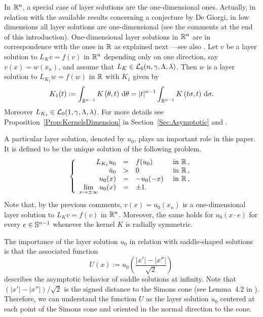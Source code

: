 In $\mathbb{R}^n$, a special case of layer solutions are the one-dimensional ones. Actually, in relation with the available results concerning a conjecture by De Giorgi, in low dimensions all layer solutions are one-dimensional (see the comments at the end of this introduction). One-dimensional layer solutions in $\mathbb{R}^n$ are in correspondence with the ones in $\mathbb{R}$ as explained next ---see also \cite{CozziPassalacqua}. Let $v$ be a layer solution to $L_K v = f(v)$ in $\mathbb{R}^n$ depending only on one direction, say $v(x) = w(x_n)$, and assume that $L_{K}\in \mathcal{L}_0(n,\gamma,\Lambda, \lambda)$. Then $w$ is a layer solution to $L_{K_1} w = f(w)$ in $\mathbb{R}$ with $K_1$ given by
$$
K_1(t) := \int_{\mathbb{R}^{n-1}} K\left(\theta,t\right) \,\mathrm{d} \theta = |t|^{n-1} \int_{\mathbb{R}^{n-1}} K\left(t\sigma,t\right) \,\mathrm{d} \sigma.
$$
Moreover $L_{K_1}\in \mathcal{L}_0(1,\gamma,\Lambda, \lambda)$. For more details see Proposition~\ref{Prop:KernelsDimension} in Section~\ref{Sec:Asymptotic} and \cite{CozziPassalacqua}. 

A particular layer solution, denoted by $u_0$, plays an important role in this paper. It is defined to be the unique solution of the following problem.
\begin{equation}
\label{Eq:LayerSolution}
\left\{\begin{array}{rcll}
L_{K_1}  u_0 &=& f(u_0) & \textrm{ in }\mathbb{R}\,,\\
\dot{u}_0 &>& 0 & \textrm{ in } \mathbb{R}\,,\\
u_0(x) & = &-u_0(-x)  & \textrm{ in }\mathbb{R}\,,\\
\displaystyle \lim_{x \to \pm \infty} u_0(x) &=& \pm 1. & 
\end{array} \right.
\end{equation}
Note that, by the previous comments, $v(x) = u_0(x_n)$ is a one-dimensional layer solution to $L_K v = f(v)$ in $\mathbb{R}^n$. Moreover, the same holds for $u_0(x\cdot e)$ for every $e\in \mathbb{S}^{n-1}$ whenever the kernel $K$ is radially symmetric.

The importance of the layer solution $u_0$ in relation with saddle-shaped solutions is that the associated function
\begin{equation}
\label{Eq:DefOfU}
U(x):= u_0 \left( \dfrac{|x'| - |x''|}{\sqrt{2}} \right)\,
\end{equation}
describes the asymptotic behavior of saddle solutions at infinity. Note that $(|x'| - |x''| )/\sqrt{2}$ is the signed distance to the Simons cone (see Lemma~4.2 in \cite{CabreTerraII}). Therefore, we can understand the function $U$ as the layer solution $u_0$ centered at each point of the Simons cone and oriented in the normal direction to the cone.

